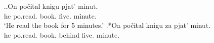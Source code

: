\ex.\label{ex:pobrosal}\ag.\label{ex:pobrosal:delim}On po\v{c}ital knigu pjat' minut.\\
he po.read. book. five. minute.\\
\trans `He read the book for 5 minutes.'
\bg.*On po\v{c}ital knigu za pjat' minut.\\
he po.read. book. behind five. minute.\\


